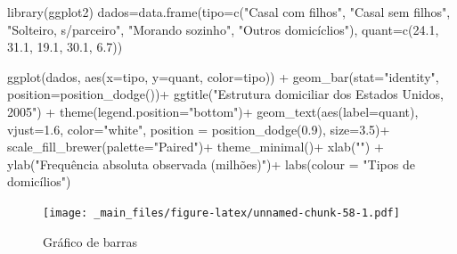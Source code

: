 \documentclass[
]{book}
\newenvironment{Shaded}{\begin{snugshade}}{\end{snugshade}}
\newcommand{\AttributeTok}[1]{\textcolor[rgb]{0.77,0.63,0.00}{#1}}
\newcommand{\FloatTok}[1]{\textcolor[rgb]{0.00,0.00,0.81}{#1}}
\newcommand{\FunctionTok}[1]{\textcolor[rgb]{0.00,0.00,0.00}{#1}}
\newcommand{\NormalTok}[1]{#1}
\newcommand{\OtherTok}[1]{\textcolor[rgb]{0.56,0.35,0.01}{#1}}
\newcommand{\SpecialCharTok}[1]{\textcolor[rgb]{0.00,0.00,0.00}{#1}}
\newcommand{\StringTok}[1]{\textcolor[rgb]{0.31,0.60,0.02}{#1}}
\begin{document}
\begin{Shaded}
\begin{Highlighting}[]
\FunctionTok{library}\NormalTok{(ggplot2)}
\NormalTok{dados}\OtherTok{=}\FunctionTok{data.frame}\NormalTok{(}\AttributeTok{tipo=}\FunctionTok{c}\NormalTok{(}\StringTok{"Casal com filhos"}\NormalTok{,}
                          \StringTok{"Casal sem filhos"}\NormalTok{,}
                          \StringTok{"Solteiro, s/parceiro"}\NormalTok{,}
                          \StringTok{"Morando sozinho"}\NormalTok{,}
                          \StringTok{"Outros domicíclios"}\NormalTok{),}
                 \AttributeTok{quant=}\FunctionTok{c}\NormalTok{(}\FloatTok{24.1}\NormalTok{, }\FloatTok{31.1}\NormalTok{, }
                       \FloatTok{19.1}\NormalTok{, }\FloatTok{30.1}\NormalTok{,}
                       \FloatTok{6.7}\NormalTok{))}

\FunctionTok{ggplot}\NormalTok{(dados, }\FunctionTok{aes}\NormalTok{(}\AttributeTok{x=}\NormalTok{tipo, }\AttributeTok{y=}\NormalTok{quant, }\AttributeTok{color=}\NormalTok{tipo)) }\SpecialCharTok{+}
\FunctionTok{geom\_bar}\NormalTok{(}\AttributeTok{stat=}\StringTok{"identity"}\NormalTok{, }\AttributeTok{position=}\FunctionTok{position\_dodge}\NormalTok{())}\SpecialCharTok{+}
\FunctionTok{ggtitle}\NormalTok{(}\StringTok{"Estrutura domiciliar dos Estados Unidos, 2005"}\NormalTok{) }\SpecialCharTok{+}
\FunctionTok{theme}\NormalTok{(}\AttributeTok{legend.position=}\StringTok{"bottom"}\NormalTok{)}\SpecialCharTok{+}
\FunctionTok{geom\_text}\NormalTok{(}\FunctionTok{aes}\NormalTok{(}\AttributeTok{label=}\NormalTok{quant), }\AttributeTok{vjust=}\FloatTok{1.6}\NormalTok{, }\AttributeTok{color=}\StringTok{"white"}\NormalTok{, }\AttributeTok{position =} \FunctionTok{position\_dodge}\NormalTok{(}\FloatTok{0.9}\NormalTok{), }\AttributeTok{size=}\FloatTok{3.5}\NormalTok{)}\SpecialCharTok{+}
\FunctionTok{scale\_fill\_brewer}\NormalTok{(}\AttributeTok{palette=}\StringTok{"Paired"}\NormalTok{)}\SpecialCharTok{+}
\FunctionTok{theme\_minimal}\NormalTok{()}\SpecialCharTok{+}
\FunctionTok{xlab}\NormalTok{(}\StringTok{""}\NormalTok{)  }\SpecialCharTok{+}
\FunctionTok{ylab}\NormalTok{(}\StringTok{"Frequência absoluta observada (milhões)"}\NormalTok{)}\SpecialCharTok{+}
\FunctionTok{labs}\NormalTok{(}\AttributeTok{colour =} \StringTok{"Tipos de domicílios"}\NormalTok{) }
\end{Highlighting}
\end{Shaded}

\begin{figure}
\centering
\texttt{[image: \_main\_files/figure-latex/unnamed-chunk-58-1.pdf]}
\caption{\label{fig:unnamed-chunk-58}Gráfico de barras}
\end{figure}
\end{document}
